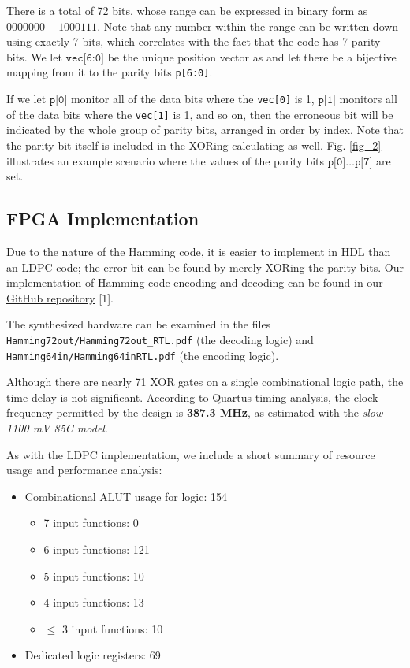 \documentclass[conference]{IEEEtran}
\begin{document}
There is a total of 72 bits, whose range can be expressed in binary form as
$0000000-1000111$. Note that any number within the range can be written down using exactly 7 bits,
which correlates with the fact that the code has 7 parity bits.
We let $\texttt{vec[6:0]}$ be the unique position vector as and let there be a bijective mapping from it to the parity bits \texttt{p[6:0]}.

If we let $\texttt{p[0]}$ monitor all of the data bits where the \texttt{vec[0]} is 1, $\texttt{p[1]}$ monitors all of the data bits where the \texttt{vec[1]} is 1, and so on, then the erroneous bit will be indicated by the whole group of parity bits, arranged in order by index.
Note that the parity bit itself is included in the XORing calculating as well.
Fig. \ref{fig_2} illustrates an example scenario where the values of the parity bits $\texttt{p[0]}\ldots\texttt{p[7]}$ are set.

\subsection{FPGA Implementation}
Due to the nature of the Hamming code, it is easier to implement in HDL than an LDPC code; the error bit can be found by merely XORing the parity bits. Our implementation of Hamming code encoding and decoding can be
found in our \href{https://github.com/luckunately/ELEC433-Projects}{GitHub
  repository} [1].

The synthesized hardware can be examined in the files \verb+Hamming72out/Hamming72out_RTL.pdf+ (the decoding logic) and \verb+Hamming64in/Hamming64inRTL.pdf+ (the encoding logic).

Although there are nearly 71 XOR gates on a single combinational logic path, the time delay is not significant. According to Quartus timing analysis, the clock frequency permitted by the design is \textbf{387.3 MHz}, as estimated with the \textit{slow 1100 mV 85C model}.

As with the LDPC implementation, we include a short summary of resource usage and performance analysis:
\begin{itemize}
  \item Combinational ALUT usage for logic: 154
  \begin{itemize}
    \item 7 input functions: 0
    \item 6 input functions: 121
    \item 5 input functions: 10
    \item 4 input functions: 13
    \item $\leq$ 3 input functions: 10
  \end{itemize}
  \item Dedicated logic registers: 69
\end{itemize}
\end{document}
